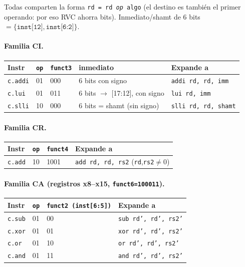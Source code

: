 \documentclass[11pt]{article}
\newcommand{\code}[1]{\texttt{#1}}
\begin{document}
Todas comparten la forma \code{rd = rd \emph{op} algo} (el destino es también el
primer operando: por eso RVC ahorra bits). Inmediato/shamt de 6 bits
$=\{\code{inst[12]}, \code{inst[6:2]}\}$.

\paragraph{Familia CI.}
\begin{center}
\small
\begin{tabular}{@{}lllll@{}}
\toprule
Instr & \code{op} & \code{funct3} & inmediato & Expande a \\
\midrule
\code{c.addi} & 01 & 000 & 6 bits con signo & \code{addi rd, rd, imm} \\
\code{c.lui}  & 01 & 011 & 6 bits $\to$ [17:12], con signo & \code{lui rd, imm} \\
\code{c.slli} & 10 & 000 & 6 bits = shamt (sin signo) & \code{slli rd, rd, shamt} \\
\bottomrule
\end{tabular}
\end{center}

\paragraph{Familia CR.}
\begin{center}
\small
\begin{tabular}{@{}llll@{}}
\toprule
Instr & \code{op} & \code{funct4} & Expande a \\
\midrule
\code{c.add} & 10 & 1001 & \code{add rd, rd, rs2} \quad(\code{rd},\code{rs2}$\neq$0) \\
\bottomrule
\end{tabular}
\end{center}

\paragraph{Familia CA (registros x8--x15, \code{funct6=100011}).}
\begin{center}
\small
\begin{tabular}{@{}llll@{}}
\toprule
Instr & \code{op} & \code{funct2 (inst[6:5])} & Expande a \\
\midrule
\code{c.sub} & 01 & 00 & \code{sub rd', rd', rs2'} \\
\code{c.xor} & 01 & 01 & \code{xor rd', rd', rs2'} \\
\code{c.or}  & 01 & 10 & \code{or  rd', rd', rs2'} \\
\code{c.and} & 01 & 11 & \code{and rd', rd', rs2'} \\
\bottomrule
\end{tabular}
\end{center}
\end{document}
